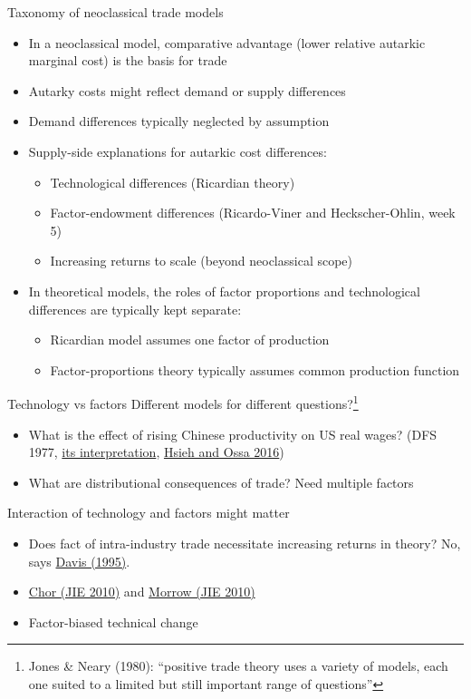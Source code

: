 \documentclass[10pt,notes=hide]{beamer}
\begin{document}
\begin{frame}{Taxonomy of neoclassical trade models}
\begin{itemize}
	\item In a neoclassical model, comparative advantage (lower relative autarkic marginal cost) is the basis for trade
	\item Autarky costs might reflect demand or supply differences
	\item Demand differences typically neglected by assumption
	\item Supply-side explanations for autarkic cost differences:
	\begin{itemize}
		\item Technological differences (Ricardian theory)
		\item Factor-endowment differences (Ricardo-Viner and Heckscher-Ohlin, week 5)
		\item Increasing returns to scale (beyond neoclassical scope)
	\end{itemize}
	\item In theoretical models,
	the roles of factor proportions and technological differences are typically kept separate:
	\begin{itemize}
		\item Ricardian model assumes one factor of production
		\item Factor-proportions theory typically assumes common production function
	\end{itemize}
\end{itemize}
\end{frame}
\begin{frame}{Technology vs factors}
Different models for different questions?\footnote{\scriptsize Jones \& Neary (1980): ``positive trade theory uses a variety of models, each one suited to a limited but still important range of questions''}
\begin{itemize}
	\item What is the effect of rising Chinese productivity on US real wages? (DFS 1977, \href{https://tradediversion.net/2011/03/29/ricardo-revisited-back-to-2004/}{its interpretation}, \href{https://faculty.chicagobooth.edu/chang-tai.hsieh/research/hsieh_ossa_jie.pdf}{Hsieh and Ossa 2016})
	\item What are distributional consequences of trade? Need multiple factors
\end{itemize}
Interaction of technology and factors might matter
\begin{itemize}
	\item Does fact of intra-industry trade necessitate increasing returns in theory? No, says \href{https://www.sciencedirect.com/science/article/pii/0022199695013833}{Davis (1995)}.
	\item \href{https://ideas.repec.org/a/eee/inecon/v82y2010i2p152-167.html}{Chor (JIE 2010)} and \href{https://ideas.repec.org/a/eee/inecon/v82y2010i2p137-151.html}{Morrow (JIE 2010)} 
	\item Factor-biased technical change
\end{itemize}
\end{frame}
\end{document}
